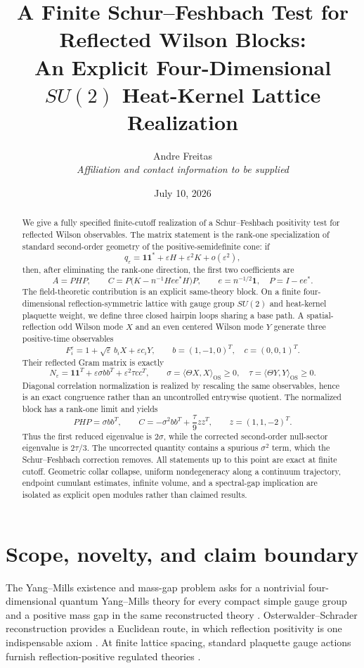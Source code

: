 \documentclass[11pt]{article}
\title{A Finite Schur--Feshbach Test for Reflected Wilson Blocks:\\
An Explicit Four-Dimensional \texorpdfstring{$SU(2)$}{SU(2)} Heat-Kernel Lattice Realization}
\author{Andre Freitas\\[2pt]\small\textit{Affiliation and contact information to be supplied}}
\date{July 10, 2026}
\newcommand{\one}{\mathbf 1}
\newcommand{\eps}{\varepsilon}
\newcommand{\OS}{\mathrm{OS}}
\begin{document}
\maketitle

\begin{abstract}
We give a fully specified finite-cutoff realization of a Schur--Feshbach positivity test for reflected Wilson observables.  The matrix statement is the rank-one specialization of standard second-order geometry of the positive-semidefinite cone: if
\[
q_\eps=\one\one^*+\eps H+\eps^2K+o(\eps^2),
\]
then, after eliminating the rank-one direction, the first two coefficients are
\[
A=PHP,
\qquad
C=P\bigl(K-n^{-1}Hee^*H\bigr)P,
\qquad
e=n^{-1/2}\one,
\quad P=I-ee^*.
\]
The field-theoretic contribution is an explicit same-theory block.  On a finite four-dimensional reflection-symmetric lattice with gauge group $SU(2)$ and heat-kernel plaquette weight, we define three closed hairpin loops sharing a base path.  A spatial-reflection odd Wilson mode $X$ and an even centered Wilson mode $Y$ generate three positive-time observables
\[
F_i^\eps=1+\sqrt\eps\,b_iX+\eps c_iY,
\qquad
b=(1,-1,0)^T,
\quad c=(0,0,1)^T.
\]
Their reflected Gram matrix is exactly
\[
N_\eps=\one\one^T+\eps\sigma bb^T+\eps^2\tau cc^T,
\qquad
\sigma=\langle\Theta X,X\rangle_{\OS}\ge0,
\quad
\tau=\langle\Theta Y,Y\rangle_{\OS}\ge0.
\]
Diagonal correlation normalization is realized by rescaling the same observables, hence is an exact congruence rather than an uncontrolled entrywise quotient.  The normalized block has a rank-one limit and yields
\[
PHP=\sigma bb^T,
\qquad
C=-\sigma^2bb^T+\frac{\tau}{9}zz^T,
\qquad z=(1,1,-2)^T.
\]
Thus the first reduced eigenvalue is $2\sigma$, while the corrected second-order null-sector eigenvalue is $2\tau/3$.  The uncorrected quantity contains a spurious $\sigma^2$ term, which the Schur--Feshbach correction removes.  All statements up to this point are exact at finite cutoff.  Geometric collar collapse, uniform nondegeneracy along a continuum trajectory, endpoint cumulant estimates, infinite volume, and a spectral-gap implication are isolated as explicit open modules rather than claimed results.
\end{abstract}

\tableofcontents

\section{Scope, novelty, and claim boundary}

The Yang--Mills existence and mass-gap problem asks for a nontrivial four-dimensional quantum Yang--Mills theory for every compact simple gauge group and a positive mass gap in the same reconstructed theory \cite{JaffeWitten2000,ClayYM}.  Osterwalder--Schrader reconstruction provides a Euclidean route, in which reflection positivity is one indispensable axiom \cite{OsterwalderSchrader1973,OsterwalderSchrader1975}.  At finite lattice spacing, standard plaquette gauge actions furnish reflection-positive regulated theories \cite{OsterwalderSeiler1978,Luscher1977}.
\end{document}
